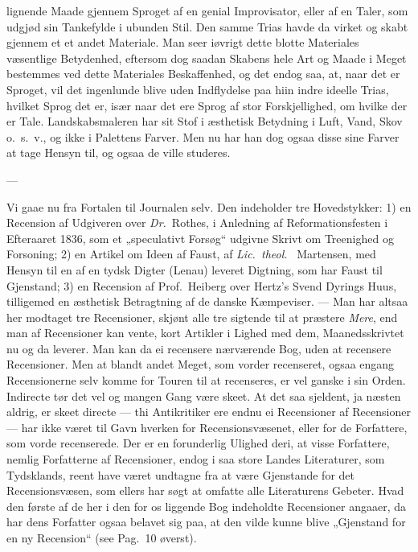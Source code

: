 \documentclass[12pt,a4paper]{book}
\newcommand{\apage}[1]{\marginnote{\footnotesize\textit{[#1]}}}
\begin{document}
lignende Maade gjennem Sproget af en genial Improvisator, eller af en
Taler, som udgjød sin Tankefylde i ubunden Stil. Den samme Trias havde da
virket og skabt gjennem et et andet Materiale.
Man seer iøvrigt dette blotte Materiales væsentlige Betydenhed, eftersom
dog saadan Skabens hele Art og Maade i Meget bestemmes ved dette
Materiales Beskaffenhed, og det endog saa, at, naar det er Sproget, vil
det ingenlunde blive uden Indflydelse paa hiin indre ideelle Trias,
hvilket Sprog det er, især naar det ere Sprog af stor Forskjellighed, om
hvilke der er Tale. Landskabsmaleren har sit Stof i æsthetisk Betydning i
Luft, Vand, Skov o.\ s.\ v., og ikke i Palettens Farver. Men nu har han
dog ogsaa disse sine Farver at tage Hensyn til, og ogsaa de ville studeres.

\begin{center}---\end{center}

Vi gaae nu fra Fortalen til Journalen selv. Den indeholder tre
Hovedstykker: 1) en Recension af Udgiveren over \textit{Dr.}\ Rothes, i Anledning
af Reformationsfesten i Efteraaret 1836, som et „speculativt Forsøg“
udgivne Skrivt om Treenighed og Forsoning; 2) en Artikel om Ideen af
Faust, af \textit{Lic.\ theol.}\ \apage{7} Martensen, med Hensyn til en af en tydsk Digter
(Lenau) leveret Digtning, som har Faust til Gjenstand; 3) en Recension af
Prof.\ Heiberg over Hertz's Svend Dyrings Huus, tilligemed en æsthetisk
Betragtning af de danske Kæmpeviser. --- Man har altsaa her modtaget tre
Recensioner, skjønt alle tre sigtende til at præstere \emph{Mere}, end man af
Recensioner kan vente, kort Artikler i Lighed med dem, Maanedsskrivtet nu
og da leverer. Man kan da ei recensere nærværende Bog, uden at recensere
Recensioner. Men at blandt andet Meget, som vorder recenseret, ogsaa
engang Recensionerne selv komme for Touren til at recenseres, er vel ganske
i sin Orden. Indirecte tør det vel og mangen Gang være skeet. At det saa
sjeldent, ja næsten aldrig, er skeet directe --- thi Antikritiker ere endnu
ei Recensioner af Recensioner --- har ikke været til Gavn hverken for
Recensionsvæsenet, eller for de Forfattere, som vorde recenserede. Der er
en forunderlig Ulighed deri, at visse Forfattere, nemlig Forfatterne af
Recensioner, endog i saa store Landes Literaturer, som Tydsklands, reent
have været undtagne fra at være Gjenstande for det Recensionsvæsen, som
ellers har søgt at omfatte alle Literaturens Gebeter. Hvad den første af de
her i den for os liggende Bog indeholdte Recensioner angaaer, da har dens
Forfatter ogsaa belavet sig paa, at den vilde kunne blive „Gjenstand for
en ny Recension“ (see Pag.\ 10 øverst).
\end{document}
